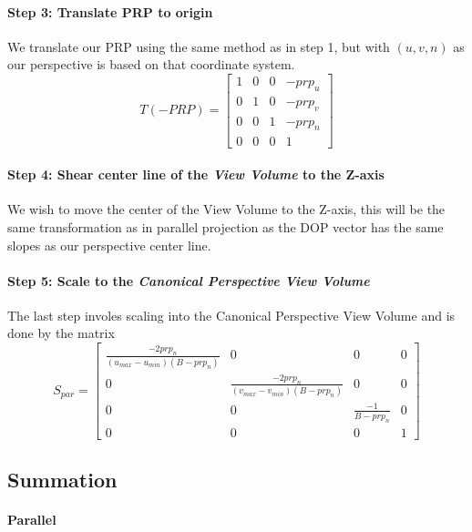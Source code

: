\documentclass{article}
\begin{document}
\paragraph{Step 3: Translate PRP to origin}
We translate our PRP using the same method as in step 1, but with
$(u,v,n)$ as our perspective is based on that coordinate system.
\begin{equation*}
    T(-PRP) = 
    \begin{bmatrix}
        1 & 0 & 0 & -prp_u\\
        0 & 1 & 0 & -prp_{v}\\
        0 & 0 & 1 & -prp_{n}\\
        0 & 0 & 0 & 1
    \end{bmatrix}
\end{equation*}

\paragraph{Step 4: Shear center line of the \emph{View Volume} to the Z-axis}
We wish to move the center of the View Volume to the Z-axis, this
will be the same transformation as in parallel projection as the 
DOP vector has the same slopes as our perspective center line.

\paragraph{Step 5: Scale to the \emph{Canonical Perspective View Volume}}
The last step involes scaling into the Canonical Perspective View Volume
and is done by the matrix
\begin{equation*}
    S_{par} = 
    \begin{bmatrix}
        \frac{-2prp_n}{(u_{max}-u_{min})(B - prp_n)} & 0 & 0 & 0\\
        0 & \frac{-2prp_n}{(v_{max}-v_{min})(B-prp_n)} & 0 & 0\\
        0 & 0 & \frac{-1}{B-prp_n} & 0\\
        0 & 0 & 0 & 1
    \end{bmatrix}
\end{equation*}


\subsection{Summation}

\paragraph{Parallel}
\end{document}
